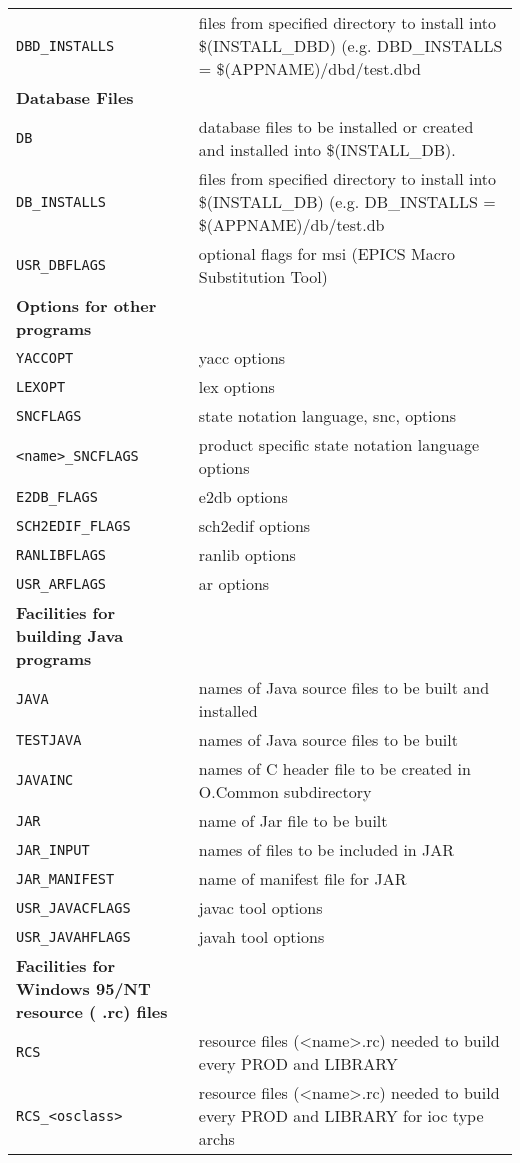 \begin{center}
\begin{longtable}{p{2.94784in}p{3.76247in}}
\verb|DBD_INSTALLS| & files from specified directory to install into \$(INSTALL\_DBD) (e.g. DBD\_INSTALLS = \$(APPNAME)/dbd/test.dbd\\
\textbf{Database Files} & \\
\verb|DB| & database files to be installed or created and installed into \$(INSTALL\_DB).\\
\verb|DB_INSTALLS| & files from specified directory to install into \$(INSTALL\_DB) (e.g. DB\_INSTALLS = \$(APPNAME)/db/test.db\\
\verb|USR_DBFLAGS| & optional flags for msi (EPICS Macro Substitution Tool)\\
\textbf{Options for other programs} &    \\
\verb|YACCOPT| & yacc options\\
\verb|LEXOPT| & lex options\\
\verb|SNCFLAGS| & state notation language, snc, options\\
\verb|<name>_SNCFLAGS| & product specific state notation language options\\
\verb|E2DB_FLAGS| & e2db options\\
\verb|SCH2EDIF_FLAGS| & sch2edif options\\
\verb|RANLIBFLAGS| & ranlib options\\
\verb|USR_ARFLAGS| & ar options\\
\textbf{Facilities for building Java programs} &    \\
\verb|JAVA| & names of Java source files to be built and installed\\
\verb|TESTJAVA| & names of Java source files to be built\\
\verb|JAVAINC| & names of C header file to be created in O.Common subdirectory\\
\verb|JAR| & name of Jar file to be built\\
\verb|JAR_INPUT| & names of files to be included in JAR\\
\verb|JAR_MANIFEST| & name of manifest file for JAR\\
\verb|USR_JAVACFLAGS| & javac tool options\\
\verb|USR_JAVAHFLAGS| & javah tool options\\
\textbf{Facilities for Windows 95/NT resource ( .rc) files} &    \\
\verb|RCS| & resource files (\textless{}name\textgreater{}.rc) needed to build every PROD and LIBRARY\\
\verb|RCS_<osclass>| & resource files (\textless{}name\textgreater{}.rc) needed to build every PROD and LIBRARY for ioc type archs\\

\end{longtable}
\end{center}

